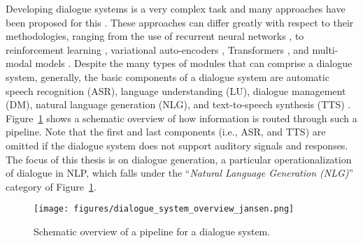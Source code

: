 Developing dialogue systems is a very complex task and many approaches have been proposed for this \citep{mctear2020conversational}.
These approaches can differ greatly with respect to their methodologies, ranging from the use of recurrent neural networks \citep{li-etal-2016-deep}, to reinforcement learning \citep{mo2018personalizing}, variational auto-encoders \citep{ruan2019condition}, Transformers \citep{madotto-etal-2020-plug}, and multi-modal models \citep{shuster-etal-2021-multi}.
Despite the many types of modules that can comprise a dialogue system, generally, the basic components of a dialogue system are automatic speech recognition (ASR), language understanding (LU), dialogue management (DM), natural language generation (NLG), and text-to-speech synthesis (TTS) \citep{chen-etal-2017-deep}. Figure~\ref{fig:dialogue_system_overview} shows a schematic overview of how information is routed through such a pipeline. Note that the first and last components (i.e., ASR, and TTS) are omitted if the dialogue system does not support auditory signals and responses. The focus of this thesis is on dialogue generation, a particular operationalization of dialogue in NLP, which falls under the ``\textit{Natural Language Generation (NLG)}'' category of Figure~\ref{fig:dialogue_system_overview}.

\begin{figure}[H]
    \centering
    \texttt{[image: figures/dialogue\_system\_overview\_jansen.png]}
    \caption{Schematic overview of a pipeline for a dialogue system.}%
    \label{fig:dialogue_system_overview}
\end{figure}





